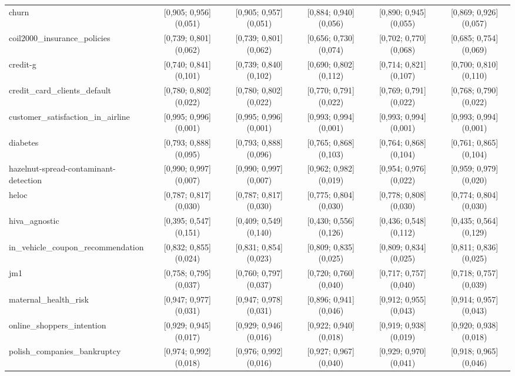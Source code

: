 \documentclass[11pt,a4paper]{article}
\begin{document}
\begin{table}[htbp]
{\begin{tabular}{@{}lccccc@{}}
        churn & [0,905; 0,956] (0,051) & [0,905; 0,957] (0,051) & [0,884; 0,940] (0,056) & [0,890; 0,945] (0,055) & [0,869; 0,926] (0,057) \\
        coil2000\_insurance\_policies & [0,739; 0,801] (0,062) & [0,739; 0,801] (0,062) & [0,656; 0,730] (0,074) & [0,702; 0,770] (0,068) & [0,685; 0,754] (0,069) \\
        credit-g & [0,740; 0,841] (0,101) & [0,739; 0,840] (0,102) & [0,690; 0,802] (0,112) & [0,714; 0,821] (0,107) & [0,700; 0,810] (0,110) \\
        credit\_card\_clients\_default & [0,780; 0,802] (0,022) & [0,780; 0,802] (0,022) & [0,770; 0,791] (0,022) & [0,769; 0,791] (0,022) & [0,768; 0,790] (0,022) \\
        customer\_satisfaction\_in\_airline & [0,995; 0,996] (0,001) & [0,995; 0,996] (0,001) & [0,993; 0,994] (0,001) & [0,993; 0,994] (0,001) & [0,993; 0,994] (0,001) \\
        diabetes & [0,793; 0,888] (0,095) & [0,793; 0,888] (0,096) & [0,765; 0,868] (0,103) & [0,764; 0,868] (0,104) & [0,761; 0,865] (0,104) \\
        hazelnut-spread-contaminant-detection & [0,990; 0,997] (0,007) & [0,990; 0,997] (0,007) & [0,962; 0,982] (0,019) & [0,954; 0,976] (0,022) & [0,959; 0,979] (0,020) \\
        heloc & [0,787; 0,817] (0,030) & [0,787; 0,817] (0,030) & [0,775; 0,804] (0,030) & [0,778; 0,808] (0,030) & [0,774; 0,804] (0,030) \\
        hiva\_agnostic & [0,395; 0,547] (0,151) & [0,409; 0,549] (0,140) & [0,430; 0,556] (0,126) & [0,436; 0,548] (0,112) & [0,435; 0,564] (0,129) \\
        in\_vehicle\_coupon\_recommendation & [0,832; 0,855] (0,024) & [0,831; 0,854] (0,023) & [0,809; 0,835] (0,025) & [0,809; 0,834] (0,025) & [0,811; 0,836] (0,025) \\
        jm1 & [0,758; 0,795] (0,037) & [0,760; 0,797] (0,037) & [0,720; 0,760] (0,040) & [0,717; 0,757] (0,040) & [0,718; 0,757] (0,039) \\
        maternal\_health\_risk & [0,947; 0,977] (0,031) & [0,947; 0,978] (0,031) & [0,896; 0,941] (0,046) & [0,912; 0,955] (0,043) & [0,914; 0,957] (0,043) \\
        online\_shoppers\_intention & [0,929; 0,945] (0,017) & [0,929; 0,946] (0,016) & [0,922; 0,940] (0,018) & [0,919; 0,938] (0,019) & [0,920; 0,938] (0,018) \\
        polish\_companies\_bankruptcy & [0,974; 0,992] (0,018) & [0,976; 0,992] (0,016) & [0,927; 0,967] (0,040) & [0,929; 0,970] (0,041) & [0,918; 0,965] (0,046) \\

\end{tabular}}
\end{table}
\end{document}
